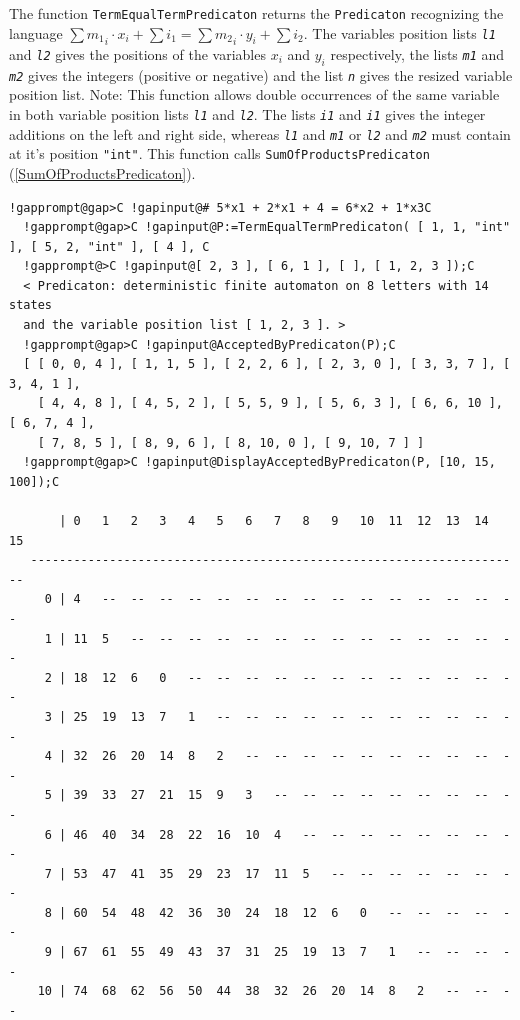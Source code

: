 \documentclass[a4paper,11pt]{report}
\begin{document}
{{{ The function \texttt{TermEqualTermPredicaton} returns the \texttt{Predicaton} recognizing the language $\sum {m_1}_i \cdot x_i + \sum i_1 = \sum {m_2}_i \cdot y_i + \sum i_2$. The variables position lists \mbox{\texttt{\mdseries\slshape l1}} and \mbox{\texttt{\mdseries\slshape l2}} gives the positions of the variables $x_i$ and $y_i$ respectively, the lists \mbox{\texttt{\mdseries\slshape m1}} and \mbox{\texttt{\mdseries\slshape m2}} gives the integers (positive or negative) and the list \mbox{\texttt{\mdseries\slshape n}} gives the resized variable position list. Note: This function allows double
occurrences of the same variable in both variable position lists \mbox{\texttt{\mdseries\slshape l1}} and \mbox{\texttt{\mdseries\slshape l2}}. The lists \mbox{\texttt{\mdseries\slshape i1}} and \mbox{\texttt{\mdseries\slshape i1}} gives the integer additions on the left and right side, whereas \mbox{\texttt{\mdseries\slshape l1}} and \mbox{\texttt{\mdseries\slshape m1}} or \mbox{\texttt{\mdseries\slshape l2}} and \mbox{\texttt{\mdseries\slshape m2}} must contain at it's position \texttt{"int"}. This function calls \texttt{SumOfProductsPredicaton} (\ref{SumOfProductsPredicaton}). 
\begin{Verbatim}[commandchars=!@C,fontsize=\small,frame=single,label=Example]
  !gapprompt@gap>C !gapinput@# 5*x1 + 2*x1 + 4 = 6*x2 + 1*x3C
  !gapprompt@gap>C !gapinput@P:=TermEqualTermPredicaton( [ 1, 1, "int" ], [ 5, 2, "int" ], [ 4 ], C
  !gapprompt@>C !gapinput@[ 2, 3 ], [ 6, 1 ], [ ], [ 1, 2, 3 ]);C
  < Predicaton: deterministic finite automaton on 8 letters with 14 states 
  and the variable position list [ 1, 2, 3 ]. >
  !gapprompt@gap>C !gapinput@AcceptedByPredicaton(P);C
  [ [ 0, 0, 4 ], [ 1, 1, 5 ], [ 2, 2, 6 ], [ 2, 3, 0 ], [ 3, 3, 7 ], [ 3, 4, 1 ],
    [ 4, 4, 8 ], [ 4, 5, 2 ], [ 5, 5, 9 ], [ 5, 6, 3 ], [ 6, 6, 10 ], [ 6, 7, 4 ],
    [ 7, 8, 5 ], [ 8, 9, 6 ], [ 8, 10, 0 ], [ 9, 10, 7 ] ]
  !gapprompt@gap>C !gapinput@DisplayAcceptedByPredicaton(P, [10, 15, 100]);C
  
       | 0   1   2   3   4   5   6   7   8   9   10  11  12  13  14  15  
   ---------------------------------------------------------------------
     0 | 4   --  --  --  --  --  --  --  --  --  --  --  --  --  --  --  
     1 | 11  5   --  --  --  --  --  --  --  --  --  --  --  --  --  --  
     2 | 18  12  6   0   --  --  --  --  --  --  --  --  --  --  --  --  
     3 | 25  19  13  7   1   --  --  --  --  --  --  --  --  --  --  --  
     4 | 32  26  20  14  8   2   --  --  --  --  --  --  --  --  --  --  
     5 | 39  33  27  21  15  9   3   --  --  --  --  --  --  --  --  --  
     6 | 46  40  34  28  22  16  10  4   --  --  --  --  --  --  --  --  
     7 | 53  47  41  35  29  23  17  11  5   --  --  --  --  --  --  --  
     8 | 60  54  48  42  36  30  24  18  12  6   0   --  --  --  --  --  
     9 | 67  61  55  49  43  37  31  25  19  13  7   1   --  --  --  --  
    10 | 74  68  62  56  50  44  38  32  26  20  14  8   2   --  --  --  
  

\end{Verbatim}}}}
\end{document}

